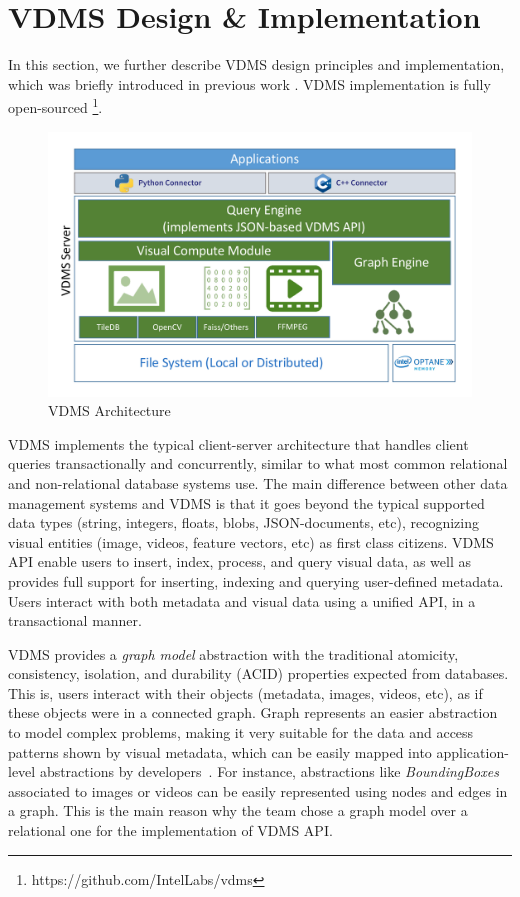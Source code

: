 \section{VDMS Design \& Implementation}
\label{arch}

In this section, we further describe VDMS design principles and implementation,
which was briefly introduced in previous work \cite{vdms-nips}.
VDMS implementation is fully open-sourced
\footnote{https://github.com/IntelLabs/vdms}.

\begin{figure}
\centering
\includegraphics[width=1\columnwidth]{figures/vdms_arch.pdf}
\caption{VDMS Architecture}
\label{fig:arch}
\end{figure}

VDMS implements the typical client-server architecture that handles
client queries transactionally and concurrently, similar to what most common
relational and non-relational database systems
\cite{mysql, postgresql, chang2008bigtable} use.
The main difference between other data management systems and VDMS is that
it goes beyond the typical supported data types (string, integers, floats,
blobs, JSON-documents, etc), recognizing visual entities (image, videos,
feature vectors, etc) as first class citizens.
VDMS API enable users to insert, index, process, and query visual data,
as well as provides full support for inserting, indexing and querying
user-defined metadata.
Users interact with both metadata and visual data using a unified API,
in a transactional manner.

VDMS provides a \textit{graph model} abstraction with the traditional
atomicity, consistency, isolation, and durability
(ACID) properties expected from databases.
This is, users interact with their objects (metadata, images, videos, etc),
as if these objects were in a connected graph.
Graph represents an easier abstraction to model complex problems,
making it very suitable for the data and access patterns shown by visual metadata,
which can be easily mapped into application-level abstractions by
developers~\cite{tao}.
For instance, abstractions like \textit{BoundingBoxes} associated to
images or videos can be easily represented using nodes and edges in a graph.
This is the main reason why the team chose a graph model over a
relational one for the implementation of VDMS API.

